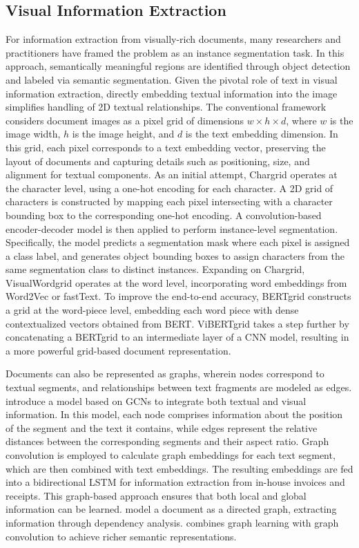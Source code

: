 \subsection{Visual Information Extraction} 

For information extraction from visually-rich documents, many researchers and practitioners have framed the problem as an instance segmentation task. In this approach, semantically meaningful regions are identified through object detection and labeled via semantic segmentation. Given the pivotal role of text in visual information extraction, directly embedding textual information into the image simplifies handling of 2D textual relationships. The conventional framework considers document images as a pixel grid of dimensions $w \times h \times d$, where $w$ is the image width, $h$ is the image height, and $d$ is the text embedding dimension. In this grid, each pixel corresponds to a text embedding vector, preserving the layout of documents and capturing details such as positioning, size, and alignment for textual components. As an initial attempt, Chargrid \citep{katti2018chargrid} operates at the character level, using a one-hot encoding for each character. A 2D grid of characters is constructed by mapping each pixel intersecting with a character bounding box to the corresponding one-hot encoding. A convolution-based encoder-decoder model is then applied to perform instance-level segmentation. Specifically, the model predicts a segmentation mask where each pixel is assigned a class label, and generates object bounding boxes to assign characters from the same segmentation class to distinct instances. Expanding on Chargrid, VisualWordgrid \citep{kerroumi2021visualwordgrid} operates at the word level, incorporating word embeddings from Word2Vec or fastText. To improve the end-to-end accuracy, BERTgrid \citep{denk2019bertgrid} constructs a grid at the word-piece level, embedding each word piece with dense contextualized vectors obtained from \ac{BERT}. ViBERTgrid \citep{lin2021vibertgrid} takes a step further by concatenating a BERTgrid to an intermediate layer of a \ac{CNN} model, resulting in a more powerful grid-based document representation. 

Documents can also be represented as graphs, wherein nodes correspond to textual segments, and relationships between text fragments are modeled as edges. \citet{liu2019graph} introduce a model based on \acp{GCN} to integrate both textual and visual information. In this model, each node comprises information about the position of the segment and the text it contains, while edges represent the relative distances between the corresponding segments and their aspect ratio. Graph convolution is employed to calculate graph embeddings for each text segment, which are then combined with text embeddings. The resulting embeddings are fed into a bidirectional \ac{LSTM} for information extraction from in-house invoices and receipts. This graph-based approach ensures that both local and global information can be learned. \citet{hwang2020spatial} model a document as a directed graph, extracting information through dependency analysis. \citet{yu2021pick} combines graph learning with graph convolution to achieve richer semantic representations.

